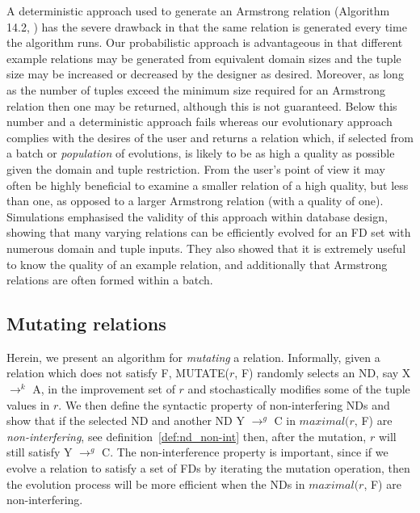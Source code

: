\smallskip

A deterministic approach used to generate an Armstrong relation
(Algorithm 14.2, \cite{Mann92}) has the severe drawback
 in that the same relation
is generated every time the algorithm runs.  Our probabilistic
approach is advantageous in that different example relations may
be generated from equivalent domain sizes and the tuple size may be
increased or decreased by the designer as desired. Moreover, as long as 
the number of tuples exceed the minimum size required for an Armstrong relation
 \cite{bdfs84,mr86} then one may 
be returned, although this is not guaranteed.  Below this number and a
deterministic approach fails 
 whereas our evolutionary approach complies with the desires of the user
and returns a relation which, if selected from a batch or {\em 
population} of evolutions, is likely to be as high a quality
as possible given the domain and tuple restriction.  From the user's
point of view it may often be highly beneficial to examine a smaller
relation of a high quality, but less than one, as opposed to a larger Armstrong
relation (with a quality of one).
Simulations
emphasised the validity of this approach within database
design, showing that many varying relations can be efficiently
evolved for an FD set with numerous domain and tuple inputs.
 They also showed that it is extremely useful to know the quality of an
 example relation, and additionally that Armstrong
relations are often formed within a batch. 



\subsection{Mutating relations}
\label{sec:mutate}

Herein, we present an algorithm for {\em mutating} a relation.
Informally, given a relation which does not satisfy F, MUTATE($r$, F) 
randomly selects an ND, say X $\to^k$ A, in the improvement set of $r$ and 
stochastically modifies some of the tuple values in $r$.
We then define the syntactic property of non-interfering NDs 
and show that if the selected ND and another ND
Y $\to^g$ C in $maximal(r$, F) are {\em non-interfering}, see definition~\ref{def:nd_non-int} then, after the mutation, 
$r$ will still satisfy Y $\to^g$ C.
The non-interference property is important,
since if we evolve a relation to satisfy a set of FDs by iterating the
mutation operation, then the evolution process will be more efficient 
when the NDs in $maximal(r$, F) are non-interfering.

